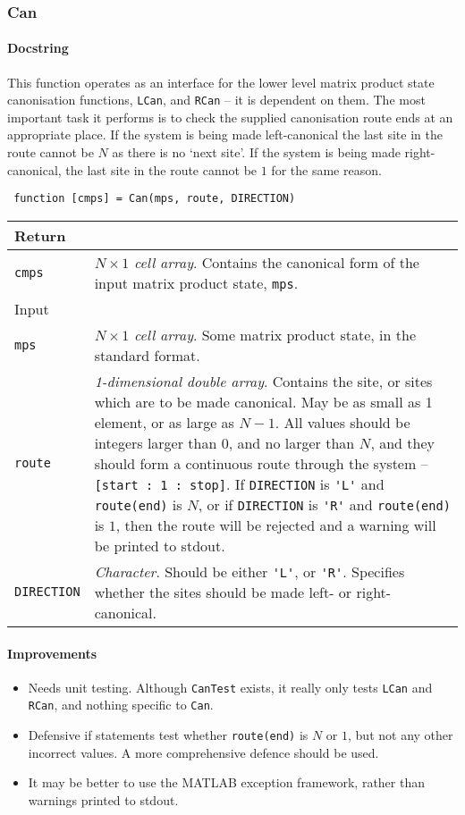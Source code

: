  \subsubsection{Can}
 \paragraph{Docstring} This function operates as an interface for the lower level matrix product state canonisation functions, \lstinline$LCan$, and \lstinline$RCan$ -- it is dependent on them. The most important task it performs is to check the supplied canonisation route ends at an appropriate place. If the system is being made left-canonical the last site in the route cannot be \(N\) as there is no `next site'. If the system is being made right-canonical, the last site in the route cannot be \(1\) for the same reason.
 \begin{lstlisting}
 function [cmps] = Can(mps, route, DIRECTION) \end{lstlisting}
 \begin{longtabu}{X[1,l]X[4,l]}
 \hline
 Return & \\ \hline
 \lstinline$cmps$ & \emph{\(N \times 1\) cell array}. Contains the canonical form of the input matrix product state, \lstinline$mps$.  \\ \hline
 Input & \\ \hline
 \lstinline$mps$ & \emph{\(N \times 1\) cell array}. Some matrix product state, in the standard format. \\
 \lstinline$route$ & \emph{1-dimensional double array}. Contains the site, or sites which are to be made canonical. May be as small as 1 element, or as large as \(N - 1\). All values should be integers larger than 0, and no larger than \(N\), and they should form a continuous route through the system -- \lstinline$[start : 1 : stop]$. If \lstinline$DIRECTION$ is \lstinline$'L'$ and \lstinline$route(end)$ is  \(N\), or if \lstinline$DIRECTION$ is \lstinline$'R'$ and \lstinline$route(end)$ is \(1\), then the route will be rejected and a warning will be printed to stdout.\\
 \lstinline$DIRECTION$ & \emph{Character}. Should be either \lstinline$'L'$, or \lstinline$'R'$. Specifies whether the sites should be made left- or right-canonical. \\
 \hline
 \end{longtabu}
 \paragraph{Improvements}
 \begin{itemize}
 \item Needs unit testing. Although \lstinline$CanTest$ exists, it really only tests \lstinline$LCan$ and \lstinline$RCan$, and nothing specific to \lstinline$Can$.
 \item Defensive if statements test whether \lstinline$route(end)$ is \(N\) or \(1\), but not any other incorrect values. A more comprehensive defence should be used.
 \item It may be better to use the MATLAB exception framework, rather than warnings printed to stdout.
 \end{itemize}
 
